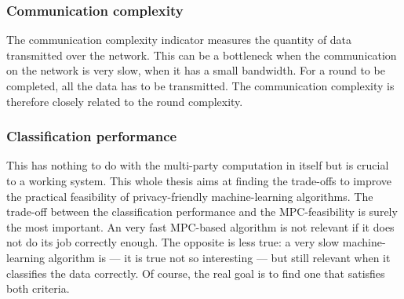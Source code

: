 \subsubsection{Communication complexity}
The communication complexity indicator measures the quantity of data transmitted over the network. This can be a bottleneck when the communication on the network is very slow, when it has a small bandwidth. For a round to be completed, all the data has to be transmitted. The communication complexity is therefore closely related to the round complexity.

\subsubsection{Classification performance}
This has nothing to do with the multi-party computation in itself but is crucial to a working system. This whole thesis aims at finding the trade-offs to improve the practical feasibility of privacy-friendly machine-learning algorithms. The trade-off between the classification performance and the MPC-feasibility is surely the most important. An very fast MPC-based algorithm is not relevant if it does not do its job correctly enough. The opposite is less true: a very slow machine-learning algorithm is --- it is true not so interesting --- but still relevant when it classifies the data correctly. Of course, the real goal is to find one that satisfies both criteria.